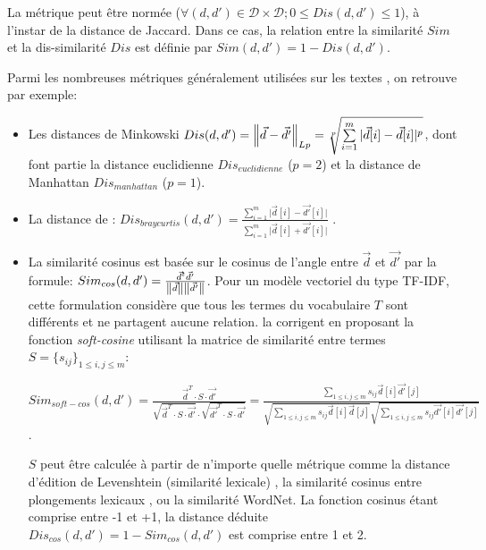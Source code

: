 La métrique peut être normée ($\forall (d,d') \in \mathcal{D} \times \mathcal{D};  0 \leq Dis(d,d') \leq 1$), à l'instar de la distance de Jaccard. Dans ce cas, la relation entre la similarité $Sim$ et la dis-similarité $Dis$ est définie par $Sim(d,d') = 1 - Dis(d,d')$.

 Parmi les nombreuses métriques généralement utilisées  sur les textes \citep{huang2008similarityTextClustering, vijaymeena2016surveySim, afzali2018Simkmeans}, on retrouve par exemple:
\begin{itemize}
	\item Les distances de Minkowski {\footnotesize $Dis(d,d') = \left\lVert\vec{d} - \vec{d'}\right\rVert_{Lp} = \sqrt[p]{\sum\limits_{i=1}^m \vert \vec{d}[i] - \vec{d}[i] \vert ^p}$}, dont font partie la distance euclidienne $Dis_{euclidienne}$ ($p=2$) et la distance de Manhattan $Dis_{manhattan}$ ($p=1$).
	\item La distance de \citet{bray1957distance-braycurtis}: $Dis_{braycurtis}(d,d') = \frac{\sum\limits_{i=1}^m \vert \vec{d}[i] - \vec{d'}[i] \vert}{\sum\limits_{i=1}^m \vert \vec{d}[i] + \vec{d'}[i] \vert}$ \citep{huang2008similarityTextClustering}.
	\item La similarité cosinus est basée sur le cosinus de l'angle entre $\vec{d}$ et $\vec{d'}$ par la formule: $Sim_{cos}(d,d') = \frac{\vec{d}^t\vec{d'}}{\left\lVert\vec{d}\right\rVert\left\lVert\vec{d'}\right\rVert}$.
	Pour un modèle vectoriel du type TF-IDF, cette formulation considère que tous les termes du vocabulaire $T$ sont différents et ne partagent aucune relation. \citet{sidorov2014softcosine} la corrigent en proposant la fonction \textit{soft-cosine} utilisant la matrice de similarité entre  termes $S=\lbrace s_{ij}\rbrace_{1\leq i,j \leq m}$: 
	
	$Sim_{soft-cos}(d,d')= \frac{{\vec{d}}^T\cdot S\cdot \vec{d'}}{\sqrt{{\vec{d}}^T\cdot S\cdot \vec{d'}}\cdot \sqrt{\vec{d'}^T\cdot S\cdot \vec{d'}}} = \frac{\sum\limits_{1\leq i,j \leq m}s_{ij}\vec{d}[i]\vec{d'}[j]}{\sqrt{\sum\limits_{1\leq i,j \leq m}s_{ij}\vec{d}[i]\vec{d}[j]}\sqrt{\sum\limits_{1\leq i,j \leq m}s_{ij}\vec{d'}[i]\vec{d'}[j]}}$.
	
	$S$ peut être calculée à partir de n'importe quelle métrique comme la distance d'édition de Levenshtein (similarité lexicale) \citep{sidorov2014softcosine},  la similarité cosinus entre  plongements lexicaux \citep{charlet2017simbow_acl, charlet2018simbow_coria}, ou la similarité WordNet. La fonction cosinus  étant comprise entre -1 et +1, la distance déduite $Dis_{cos}(d,d') = 1 - Sim_{cos}(d,d')$ est comprise entre 1 et 2.
	

\end{itemize}
